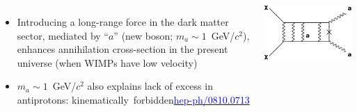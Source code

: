 \documentclass[compress]{beamer}
\begin{document}
\begin{frame}
\begin{columns}
\begin{itemize}
\item Introducing a long-range force in the dark matter sector,
  mediated by ``$a$'' (new boson; $m_a \sim 1$~GeV/$c^2$), enhances
  annihilation cross-section in the present universe (when WIMPs have
  low velocity)
\item $m_a \sim 1$~GeV/$c^2$ also explains lack of excess in antiprotons: \mbox{kinematically forbidden\hspace{1.5 cm}\href{http://arxiv.org/abs/0810.0713}{\textcolor{blue}{hep-ph/0810.0713}}\hspace{-9 cm}}
\end{itemize}

\includegraphics[width=\linewidth]{sommerfeld.pdf}
\end{columns}
\end{frame}
\end{document}
